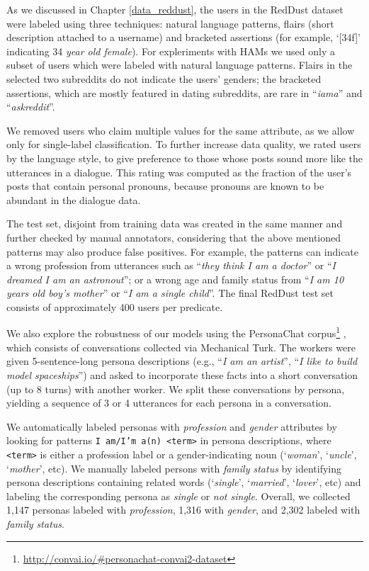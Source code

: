 As we discussed in Chapter \ref{data_reddust}, the users in the RedDust dataset were labeled using three techniques: natural language patterns, flairs (short description attached to a username) and bracketed assertions (for example, `[34f]' indicating 34 \textit{year old female}). For expleriments with HAMs we used only a subset of users which were labeled with natural language patterns. Flairs in the selected two subreddits do not indicate the users' genders; the bracketed assertions, which are mostly featured in dating subreddits, are rare in ``\textit{iama}'' and ``\textit{askreddit}''.

We removed users who claim multiple values for the
same attribute, as we allow only for single-label classification. 
To further increase data quality, we rated users by the language style, to give preference to those whose posts sound more like the utterances in a dialogue. This rating was computed as
the fraction of the user's posts that contain personal pronouns, because pronouns are known to be abundant in the dialogue data.

The test set, disjoint from training data was created in the same manner and further checked by manual annotators, considering that the above mentioned patterns may also produce false positives.
For example, the patterns can indicate a wrong profession from utterances such as ``\textit{they think I am a doctor}'' or ``\textit{I dreamed  I am an astronout}''; or a wrong age and family status
from ``\textit{I am 10 years old boy's mother}'' or
``\textit{I am a single child}''.
The final RedDust test set consists of approximately 400 users per predicate.

 We also explore the robustness of our models using the PersonaChat corpus\footnote{\href{http://convai.io/\#personachat-convai2-dataset}{http://convai.io/\#personachat-convai2-dataset}} \cite{zhang2018personalizing},
which consists of conversations collected via Mechanical Turk.
The workers were given 5-sentence-long persona descriptions (e.g., ``\textit{I am an artist}'', ``\textit{I like to build model spaceships}'') and asked to incorporate these facts into a short conversation (up to 8 turns) with another worker.
We split these conversations by persona, yielding a sequence of 3 or 4 utterances for each persona in a conversation.

We automatically labeled personas with \textit{profession} and \textit{gender} attributes by looking for patterns \texttt{I am/I'm a(n) <term>} in persona descriptions, where 
\texttt{<term>} is either a profession label
or a gender-indicating noun (`\textit{woman}', `\textit{uncle}', `\textit{mother}', etc).
We manually labeled persons with \textit{family status} by identifying persona
descriptions containing related words (`\textit{single}', `\textit{married}', `\textit{lover}', etc) and labeling the corresponding persona as \textit{single} or \textit{not single}.
Overall, we collected 1,147 personas labeled with \textit{profession}, 1,316 with \textit{gender}, and 2,302 labeled with \textit{family status}.

